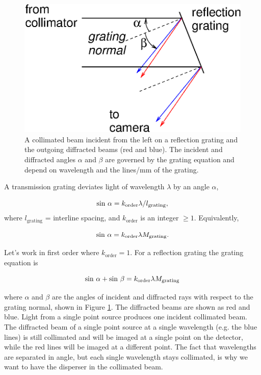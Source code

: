 \documentclass[12pt]{article}
\begin{document}
\begin{figure}[ht]
\centerline{
\includegraphics[width=4.5truein]{grating1.eps}
}
\caption{A collimated beam incident from the left 
on a reflection grating
and the outgoing diffracted beams (red and blue).
The incident and diffracted angles $\alpha$ and $\beta$ are
governed by the grating equation and depend on wavelength
and the lines/mm of the grating.
}
\label{fig-grating}
\end{figure}


A transmission grating deviates light of wavelength $\lambda$
by an angle $\alpha$,

$$ {\rm sin}~\alpha = k_{\mathrm{order}} \lambda / l_{\mathrm{grating}}, $$
where $l_{\mathrm{grating}}$ = interline spacing, and $k_{\mathrm{order}}$ is an
integer $\geq 1$.  Equivalently,

$$ {\rm sin}~\alpha = k_{\mathrm{order}} \lambda M_{\mathrm{grating}}. $$

Let's work in first order where $k_{\mathrm{order}} = 1$.
For a reflection grating the grating equation is 

$$ {\rm sin}~\alpha + {\rm sin}~\beta = k_{\mathrm{order}} \lambda M_{\mathrm{grating}} $$

where $\alpha$ and $\beta$ are the angles of incident and diffracted rays
with respect to the grating normal, shown in Figure
\ref{fig-grating}.  The diffracted beams are shown as red and blue.
Light from a single point source produces one incident collimated beam.
The diffracted beam of a single point source at a single
wavelength (e.g. the blue lines) is still collimated and will be
imaged at a single point on the detector, while the red lines will
be imaged at a different point.  The fact that wavelengths are
separated in angle, but each single wavelength stays collimated,
is why we want to have the disperser in the collimated beam.
\end{document}
